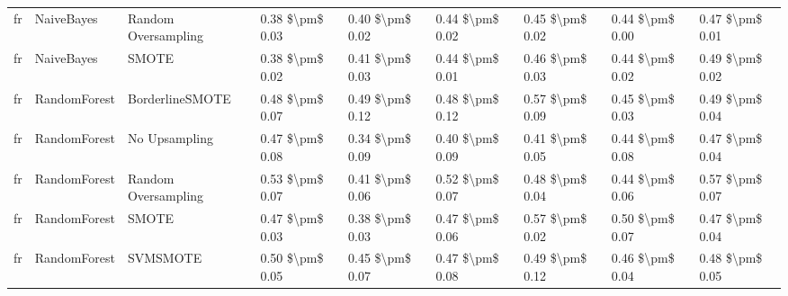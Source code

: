 \begin{tabular}{lllllllll}
      fr &                      NaiveBayes &           Random Oversampling & 0.38 \$\textbackslash pm\$ 0.03 &           0.40 \$\textbackslash pm\$ 0.02 &       0.44 \$\textbackslash pm\$ 0.02 &        0.45 \$\textbackslash pm\$ 0.02 &                         0.44 \$\textbackslash pm\$ 0.00 &     0.47 \$\textbackslash pm\$ 0.01 \\
      fr &                      NaiveBayes &                         SMOTE & 0.38 \$\textbackslash pm\$ 0.02 &           0.41 \$\textbackslash pm\$ 0.03 &       0.44 \$\textbackslash pm\$ 0.01 &        0.46 \$\textbackslash pm\$ 0.03 &                         0.44 \$\textbackslash pm\$ 0.02 &     0.49 \$\textbackslash pm\$ 0.02 \\
      fr &                    RandomForest &               BorderlineSMOTE & 0.48 \$\textbackslash pm\$ 0.07 &           0.49 \$\textbackslash pm\$ 0.12 &       0.48 \$\textbackslash pm\$ 0.12 &        0.57 \$\textbackslash pm\$ 0.09 &                         0.45 \$\textbackslash pm\$ 0.03 &     0.49 \$\textbackslash pm\$ 0.04 \\
      fr &                    RandomForest &                 No Upsampling & 0.47 \$\textbackslash pm\$ 0.08 &           0.34 \$\textbackslash pm\$ 0.09 &       0.40 \$\textbackslash pm\$ 0.09 &        0.41 \$\textbackslash pm\$ 0.05 &                         0.44 \$\textbackslash pm\$ 0.08 &     0.47 \$\textbackslash pm\$ 0.04 \\
      fr &                    RandomForest &           Random Oversampling & 0.53 \$\textbackslash pm\$ 0.07 &           0.41 \$\textbackslash pm\$ 0.06 &       0.52 \$\textbackslash pm\$ 0.07 &        0.48 \$\textbackslash pm\$ 0.04 &                         0.44 \$\textbackslash pm\$ 0.06 &     0.57 \$\textbackslash pm\$ 0.07 \\
      fr &                    RandomForest &                         SMOTE & 0.47 \$\textbackslash pm\$ 0.03 &           0.38 \$\textbackslash pm\$ 0.03 &       0.47 \$\textbackslash pm\$ 0.06 &        0.57 \$\textbackslash pm\$ 0.02 &                         0.50 \$\textbackslash pm\$ 0.07 &     0.47 \$\textbackslash pm\$ 0.04 \\
      fr &                    RandomForest &                      SVMSMOTE & 0.50 \$\textbackslash pm\$ 0.05 &           0.45 \$\textbackslash pm\$ 0.07 &       0.47 \$\textbackslash pm\$ 0.08 &        0.49 \$\textbackslash pm\$ 0.12 &                         0.46 \$\textbackslash pm\$ 0.04 &     0.48 \$\textbackslash pm\$ 0.05 \\

\end{tabular}
